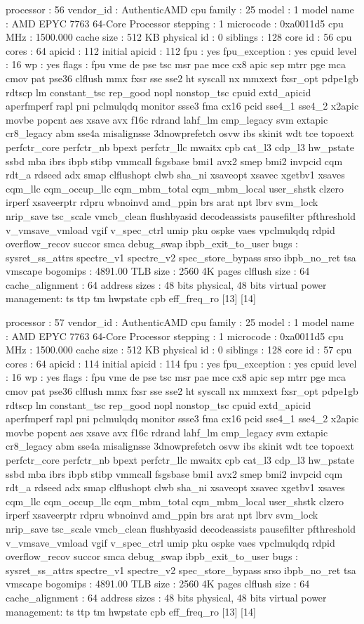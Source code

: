processor	: 56
vendor_id	: AuthenticAMD
cpu family	: 25
model		: 1
model name	: AMD EPYC 7763 64-Core Processor
stepping	: 1
microcode	: 0xa0011d5
cpu MHz		: 1500.000
cache size	: 512 KB
physical id	: 0
siblings	: 128
core id		: 56
cpu cores	: 64
apicid		: 112
initial apicid	: 112
fpu		: yes
fpu_exception	: yes
cpuid level	: 16
wp		: yes
flags		: fpu vme de pse tsc msr pae mce cx8 apic sep mtrr pge mca cmov pat pse36 clflush mmx fxsr sse sse2 ht syscall nx mmxext fxsr_opt pdpe1gb rdtscp lm constant_tsc rep_good nopl nonstop_tsc cpuid extd_apicid aperfmperf rapl pni pclmulqdq monitor ssse3 fma cx16 pcid sse4_1 sse4_2 x2apic movbe popcnt aes xsave avx f16c rdrand lahf_lm cmp_legacy svm extapic cr8_legacy abm sse4a misalignsse 3dnowprefetch osvw ibs skinit wdt tce topoext perfctr_core perfctr_nb bpext perfctr_llc mwaitx cpb cat_l3 cdp_l3 hw_pstate ssbd mba ibrs ibpb stibp vmmcall fsgsbase bmi1 avx2 smep bmi2 invpcid cqm rdt_a rdseed adx smap clflushopt clwb sha_ni xsaveopt xsavec xgetbv1 xsaves cqm_llc cqm_occup_llc cqm_mbm_total cqm_mbm_local user_shstk clzero irperf xsaveerptr rdpru wbnoinvd amd_ppin brs arat npt lbrv svm_lock nrip_save tsc_scale vmcb_clean flushbyasid decodeassists pausefilter pfthreshold v_vmsave_vmload vgif v_spec_ctrl umip pku ospke vaes vpclmulqdq rdpid overflow_recov succor smca debug_swap ibpb_exit_to_user
bugs		: sysret_ss_attrs spectre_v1 spectre_v2 spec_store_bypass srso ibpb_no_ret tsa vmscape
bogomips	: 4891.00
TLB size	: 2560 4K pages
clflush size	: 64
cache_alignment	: 64
address sizes	: 48 bits physical, 48 bits virtual
power management: ts ttp tm hwpstate cpb eff_freq_ro [13] [14]

processor	: 57
vendor_id	: AuthenticAMD
cpu family	: 25
model		: 1
model name	: AMD EPYC 7763 64-Core Processor
stepping	: 1
microcode	: 0xa0011d5
cpu MHz		: 1500.000
cache size	: 512 KB
physical id	: 0
siblings	: 128
core id		: 57
cpu cores	: 64
apicid		: 114
initial apicid	: 114
fpu		: yes
fpu_exception	: yes
cpuid level	: 16
wp		: yes
flags		: fpu vme de pse tsc msr pae mce cx8 apic sep mtrr pge mca cmov pat pse36 clflush mmx fxsr sse sse2 ht syscall nx mmxext fxsr_opt pdpe1gb rdtscp lm constant_tsc rep_good nopl nonstop_tsc cpuid extd_apicid aperfmperf rapl pni pclmulqdq monitor ssse3 fma cx16 pcid sse4_1 sse4_2 x2apic movbe popcnt aes xsave avx f16c rdrand lahf_lm cmp_legacy svm extapic cr8_legacy abm sse4a misalignsse 3dnowprefetch osvw ibs skinit wdt tce topoext perfctr_core perfctr_nb bpext perfctr_llc mwaitx cpb cat_l3 cdp_l3 hw_pstate ssbd mba ibrs ibpb stibp vmmcall fsgsbase bmi1 avx2 smep bmi2 invpcid cqm rdt_a rdseed adx smap clflushopt clwb sha_ni xsaveopt xsavec xgetbv1 xsaves cqm_llc cqm_occup_llc cqm_mbm_total cqm_mbm_local user_shstk clzero irperf xsaveerptr rdpru wbnoinvd amd_ppin brs arat npt lbrv svm_lock nrip_save tsc_scale vmcb_clean flushbyasid decodeassists pausefilter pfthreshold v_vmsave_vmload vgif v_spec_ctrl umip pku ospke vaes vpclmulqdq rdpid overflow_recov succor smca debug_swap ibpb_exit_to_user
bugs		: sysret_ss_attrs spectre_v1 spectre_v2 spec_store_bypass srso ibpb_no_ret tsa vmscape
bogomips	: 4891.00
TLB size	: 2560 4K pages
clflush size	: 64
cache_alignment	: 64
address sizes	: 48 bits physical, 48 bits virtual
power management: ts ttp tm hwpstate cpb eff_freq_ro [13] [14]

